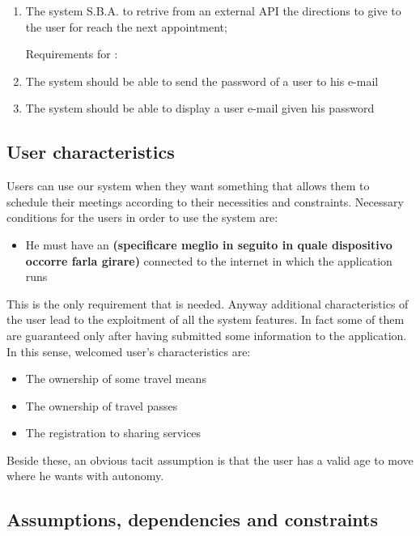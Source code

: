 \begin{enumerate}
\item The system S.B.A. to retrive from an external API the directions to give to the user for reach the next appointment;


Requirements for :

\item The system should be able to send the password of a user to his e-mail

\item The system should be able to display a user e-mail given his password 


\end{enumerate}


\subsection{User characteristics}
Users can use our system when they want something that allows them to schedule their meetings according to their necessities and constraints. Necessary conditions for the users in order to use the system are: 

\begin{itemize}
\item He must have an \textbf{(specificare meglio in seguito in quale dispositivo occorre farla girare)} connected to the internet in which the application runs
\end{itemize}

This is the only requirement that is needed. Anyway additional characteristics of the user lead to the exploitment of all the system features. In fact some of them are guaranteed only after having submitted some information to the application.
In this sense, welcomed user's characteristics are:

\begin{itemize}
\item The ownership of some travel means
\item The ownership of travel passes
\item The registration to sharing services
\end{itemize}

Beside these, an obvious tacit assumption is that the user has a valid age to move where he wants with autonomy.


\subsection{ Assumptions, dependencies and constraints}

